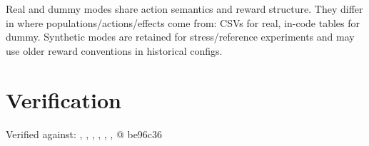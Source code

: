 \documentclass[11pt]{article}
\begin{document}
Real and dummy modes share action semantics and reward structure. They differ in
where populations/actions/effects come from: CSVs for real, in-code tables for
dummy. Synthetic modes are retained for stress/reference experiments and may use
older reward conventions in historical configs.

\section*{Verification}

Verified against: , , , , , ,  @ be96c36
\end{document}
